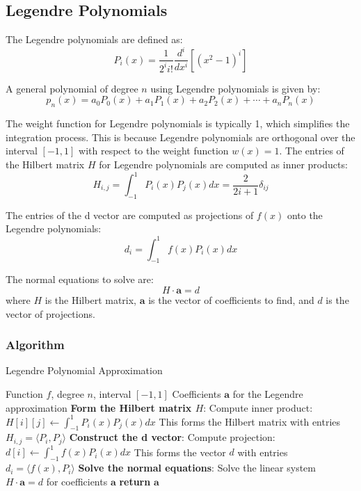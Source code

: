 \documentclass[10pt]{article}
\begin{document}
\subsection{Legendre Polynomials}

The Legendre polynomials are defined as:
\begin{equation}
P_i(x) = \frac{1}{2^i i!} \frac{d^i}{dx^i} \left[ (x^2 - 1)^i \right]
\end{equation}

A general polynomial of degree $ n $ using Legendre polynomials is given by:
\begin{equation}
p_n(x) = a_0 P_0(x) + a_1 P_1(x) + a_2 P_2(x) + \cdots + a_n P_n(x)
\end{equation}

The weight function for Legendre polynomials is typically 1, which simplifies the integration process. This is because Legendre polynomials are orthogonal over the interval \([-1, 1]\) with respect to the weight function \(w(x) = 1\). The entries of the Hilbert matrix \( H \) for Legendre polynomials are computed as inner products:
\begin{equation}
H_{i,j} = \int_{-1}^{1} P_i(x) P_j(x) dx = \frac{2}{2i+1} \delta_{ij}
\end{equation}

The entries of the d vector are computed as projections of \( f(x) \) onto the Legendre polynomials:
\begin{equation}
d_i = \int_{-1}^{1} f(x) P_i(x) dx
\end{equation}

The normal equations to solve are:
\begin{equation}
H \cdot \mathbf{a} = d
\end{equation}
where \( H \) is the Hilbert matrix, \( \mathbf{a} \) is the vector of coefficients to find, and \( d \) is the vector of projections.

\subsubsection{Algorithm}
\begin{algorithm}[H]
\caption{Legendre Polynomial Approximation}\label{alg:legendre}
\begin{algorithmic}
\Require Function $f$, degree $n$, interval $[-1, 1]$
\Ensure Coefficients $\mathbf{a}$ for the Legendre approximation
\State \textbf{Form the Hilbert matrix $H$}:
        \State Compute inner product: $H[i][j] \gets \int_{-1}^{1} P_i(x) P_j(x) dx$
        \State This forms the Hilbert matrix with entries $H_{i,j} = \langle P_i, P_j \rangle$
    \EndFor
\EndFor
\State \textbf{Construct the d vector}:
    \State Compute projection: $d[i] \gets \int_{-1}^{1} f(x) P_i(x) dx$
    \State This forms the vector $d$ with entries $d_i = \langle f(x), P_i \rangle$
\EndFor
\State \textbf{Solve the normal equations}:
\State Solve the linear system $H \cdot \mathbf{a} = d$ for coefficients $\mathbf{a}$
\State \textbf{return} $\mathbf{a}$
\end{algorithmic}
\end{algorithm}
\end{document}
